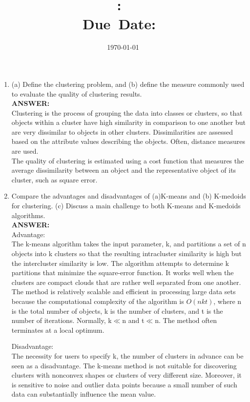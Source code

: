 \documentclass{article}
\title{\textbf{\hmwkClass:\ 
      \hmwkTitle}\\\normalsize\small{Due\ Date:\
    \hmwkDueDate}}
\date{\today}
\author{\textbf{\hmwkAuthorName}}
\begin{document}
\maketitle

\begin{enumerate}
\item (a) Define the clustering problem, and (b) define the measure
  commonly used to evaluate the quality of clustering results. \\
\textbf{ANSWER:}\\ 
Clustering is the process of grouping the data into classes or
clusters, so that objects within a cluster have high similarity in
comparison to one another but are very dissimilar to objects in other
clusters. Dissimilarities are assessed based on the attribute values
describing the objects. Often, distance measures are used.\\
The quality of clustering is estimated using a cost function that
measures the average dissimilarity between an object and the
representative object of its cluster, such as square error.

\item Compare the advantages and disadvantages of (a)K-means and (b)
  K-medoids for clustering. (c) Discuss a main challenge to both
  K-means and K-medoids algorithms.\\
\textbf{ANSWER:} \\
Advantage:\\
The k-means algorithm takes the input parameter, k, and partitions a
set of n objects into k clusters so that the resulting intracluster
similarity is high but the intercluster similarity is low. The
algorithm attempts to determine k partitions that minimize the
square-error function. It works well when the clusters are compact
clouds that are rather well separated from one another. The method is
relatively scalable and efficient in processing large data sets
because the computational complexity of the algorithm is $O(nkt)$, where
n is the total number of objects, k is the number of clusters, and t
is the number of iterations. Normally, k$\ll$n and t$\ll$n. The method often
terminates at a local optimum. 

Disadvantage:\\
The necessity for users to specify k,
the number of clusters in advance can be seen as a disadvantage. The
k-means method is not suitable for discovering clusters with
nonconvex shapes or clusters of very different size.  Moreover, it is
sensitive to noise and outlier data points because a small number of
such data can substantially influence the mean value.


\end{enumerate}
\end{document}
